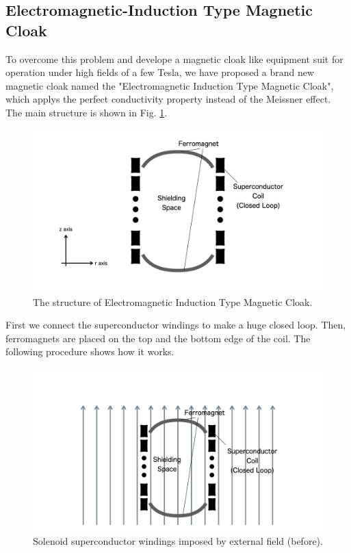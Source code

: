 \subsection{Electromagnetic-Induction Type Magnetic Cloak}
To overcome this problem and develope a magnetic cloak like equipment suit for operation under high fields of a few Tesla,
we have proposed a brand new magnetic cloak named the "Electromagnetic Induction Type Magnetic Cloak",
which applys the perfect conductivity property instead of the Meissner effect.
The main structure is shown in Fig. \ref{fig:EIMCStructure}.
\begin{figure}[H]
  \includegraphics[width=13cm, bb=9 9 900 550]{./section2Proposal/EMICStructure.png}
  \caption{The structure of Electromagnetic Induction Type Magnetic Cloak.}
  \label{fig:EIMCStructure}
\end{figure}
First we connect the superconductor windings to make a huge closed loop.
Then, ferromagnets are placed on the top and the bottom edge of the coil.
The following procedure shows how it works.
\begin{figure}[H]
  \includegraphics[width=13cm, bb=9 9 900 550]{./section2Proposal/EMIC1.png}
  \caption{Solenoid superconductor windings imposed by external field (before).}
  \label{fig:EIMC1}
\end{figure}
